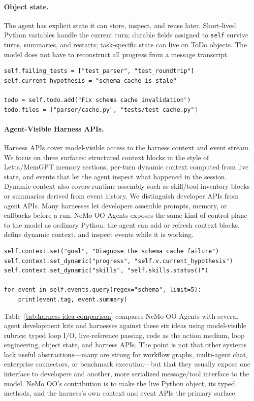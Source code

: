 \documentclass[11pt, logo, onecolumn, copyright, colorlinks=true, allcolors=blue]{nvidiatechreport}
\begin{document}
\paragraph{Object state.}
The agent has explicit state it can store, inspect, and reuse
later.  Short-lived Python variables handle the current turn; durable fields assigned to \texttt{self} survive turns, summaries, and restarts; task-specific state can
live on ToDo objects.  The model does not have to reconstruct all progress from a
message transcript.

\begin{lstlisting}
self.failing_tests = ["test_parser", "test_roundtrip"]
self.current_hypothesis = "schema cache is stale"

todo = self.todo.add("Fix schema cache invalidation")
todo.files = ["parser/cache.py", "tests/test_cache.py"]
\end{lstlisting}

\paragraph{Agent-Visible Harness APIs.}
Harness APIs cover model-visible access to the harness context and event
stream.  We focus on three surfaces: structured context blocks in the style of
Letta/MemGPT memory sections, per-turn dynamic context computed from live state,
and events that let the agent inspect what happened in the session.  Dynamic
context also covers runtime assembly such as skill/tool inventory blocks or
summaries derived from event history.  We distinguish developer APIs from agent
APIs.  Many harnesses let developers assemble prompts, memory, or callbacks
before a run.  NeMo OO Agents exposes the same kind of control plane to the
model as ordinary Python: the agent can add or refresh context blocks, define
dynamic context, and inspect events while it is working.

\begin{lstlisting}
self.context.set("goal", "Diagnose the schema cache failure")
self.context.set_dynamic("progress", "self.v.current_hypothesis")
self.context.set_dynamic("skills", "self.skills.status()")

for event in self.events.query(regex="schema", limit=5):
    print(event.tag, event.summary)
\end{lstlisting}

Table~\ref{tab:harness-idea-comparison} compares NeMo OO Agents with several
agent development kits and harnesses against these six ideas using model-visible
rubrics: typed loop I/O, live-reference passing, code as the action medium, loop
engineering, object state, and harness APIs. The point is not that other systems
lack useful abstractions---many are strong for workflow graphs, multi-agent
chat, enterprise connectors, or benchmark execution---but that they usually
expose one interface to developers and another, more serialized message/tool
interface to the model. NeMo OO's contribution is to make the live Python
object, its typed methods, and the harness's own context and event APIs the
primary surface.
\end{document}
